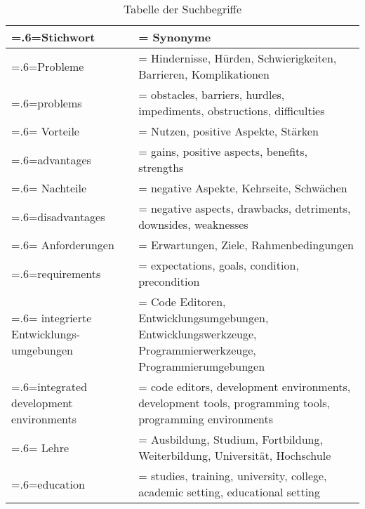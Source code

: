 \begin{table}[htbp]
    \centering
    \begin{tabularx}{\textwidth}{| >{\hsize=.6\hsize\linewidth=\hsize}X |
            >{\hsize=1.4\hsize\linewidth=\hsize}X |}
        \hline
        Stichwort                           & Synonyme                                                                                                  \\
        \hline
        Probleme                            & Hindernisse, Hürden, Schwierigkeiten, Barrieren, Komplikationen                                           \\ problems                            & obstacles, barriers, hurdles, impediments, obstructions, difficulties \\
        \hline
        Vorteile                            & Nutzen, positive Aspekte, Stärken                                                                         \\ advantages                          & gains, positive aspects, benefits, strengths \\
        \hline
        Nachteile                           & negative Aspekte, Kehrseite, Schwächen                                                                    \\ disadvantages                       & negative aspects, drawbacks, detriments, downsides, weaknesses \\
        \hline
        Anforderungen                       & Erwartungen, Ziele, Rahmenbedingungen                                                                     \\ requirements                        & expectations, goals, condition, precondition \\
        \hline
        integrierte Entwicklungs-umgebungen & Code Editoren, Entwicklungsumgebungen, Entwicklungswerkzeuge, Programmierwerkzeuge, Programmierumgebungen \\ integrated development environments & code editors, development environments, development tools, programming tools, programming environments \\
        \hline
        Lehre                               & Ausbildung, Studium, Fortbildung, Weiterbildung, Universität, Hochschule                                  \\ education                           & studies, training, university, college, academic setting, educational setting  \\
        \hline
    \end{tabularx}
    \caption{Tabelle der Suchbegriffe}
    \label{table:search-terms}
\end{table}

